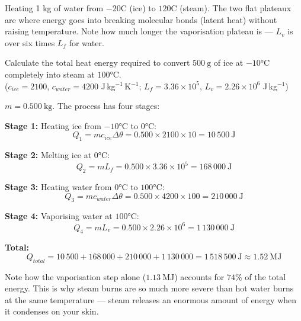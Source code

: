\begin{diagbox}
\begin{center}
\end{center}
\small Heating 1 kg of water from $-20$\textdegree C
(ice) to $120$\textdegree C (steam). The two flat
plateaux are where energy goes into breaking molecular
bonds (latent heat) without raising temperature.
Note how much longer the vaporisation plateau is ---
$L_v$ is over six times $L_f$ for water.
\end{diagbox}

\begin{examplebox}[15.4]
Calculate the total heat energy required to convert
$500\ \text{g}$ of ice at $-10°\text{C}$ completely
into steam at $100°\text{C}$.\\
($c_{ice} = 2100$, $c_{water} = 4200$
J\,kg$^{-1}$\,K$^{-1}$;
$L_f = 3.36\times10^5$,
$L_v = 2.26\times10^6$ J\,kg$^{-1}$)
\end{examplebox}

\begin{solutionbox}
$m = 0.500\ \text{kg}$. The process has four stages:

\textbf{Stage 1:} Heating ice from $-10°\text{C}$
to $0°\text{C}$:
\[
  Q_1 = mc_{ice}\Delta\theta
  = 0.500 \times 2100 \times 10
  = 10\,500\ \text{J}
\]

\textbf{Stage 2:} Melting ice at $0°\text{C}$:
\[
  Q_2 = mL_f
  = 0.500 \times 3.36\times10^5
  = 168\,000\ \text{J}
\]

\textbf{Stage 3:} Heating water from $0°\text{C}$
to $100°\text{C}$:
\[
  Q_3 = mc_{water}\Delta\theta
  = 0.500 \times 4200 \times 100
  = 210\,000\ \text{J}
\]

\textbf{Stage 4:} Vaporising water at $100°\text{C}$:
\[
  Q_4 = mL_v
  = 0.500 \times 2.26\times10^6
  = 1\,130\,000\ \text{J}
\]

\textbf{Total:}
\[
  Q_{total} = 10\,500 + 168\,000 + 210\,000
  + 1\,130\,000
  = 1\,518\,500\ \text{J} \approx 1.52\ \text{MJ}
\]

Note how the vaporisation step alone ($1.13\ \text{MJ}$)
accounts for $74\%$ of the total energy. This is why
steam burns are so much more severe than hot water burns
at the same temperature --- steam releases an enormous
amount of energy when it condenses on your skin.
\end{solutionbox}

